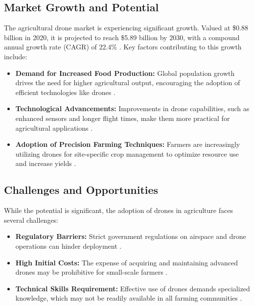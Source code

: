 \subsection{Market Growth and Potential}

The agricultural drone market is experiencing significant growth. Valued at \$0.88 billion in 2020, it is projected to reach \$5.89 billion by 2030, with a compound annual growth rate (CAGR) of 22.4\% \citep{alliedmarketresearch2021}. Key factors contributing to this growth include:

\begin{itemize} \item \textbf{Demand for Increased Food Production:} Global population growth drives the need for higher agricultural output, encouraging the adoption of efficient technologies like drones \citep{nazarov2023}. \item \textbf{Technological Advancements:} Improvements in drone capabilities, such as enhanced sensors and longer flight times, make them more practical for agricultural applications \citep{guardianagriculture}. \item \textbf{Adoption of Precision Farming Techniques:} Farmers are increasingly utilizing drones for site-specific crop management to optimize resource use and increase yields \citep{alliedmarketresearch2021}. \end{itemize}

\subsection{Challenges and Opportunities}

While the potential is significant, the adoption of drones in agriculture faces several challenges:

\begin{itemize} \item \textbf{Regulatory Barriers:} Strict government regulations on airspace and drone operations can hinder deployment \citep{nazarov2023}. \item \textbf{High Initial Costs:} The expense of acquiring and maintaining advanced drones may be prohibitive for small-scale farmers \citep{alliedmarketresearch2021}. \item \textbf{Technical Skills Requirement:} Effective use of drones demands specialized knowledge, which may not be readily available in all farming communities \citep{lin2023}. \end{itemize}

